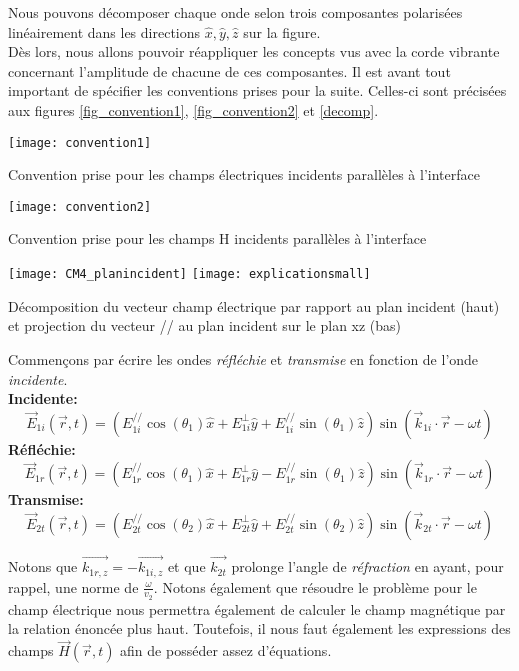 Nous pouvons décomposer chaque onde selon trois composantes polarisées linéairement dans les directions $\hat{x}, \hat{y}, \hat{z}$ sur la figure. \\
Dès lors, nous allons pouvoir réappliquer les concepts vus avec la corde vibrante concernant l'amplitude de chacune de ces composantes. Il est avant tout important de spécifier les conventions prises pour la suite. Celles-ci sont précisées aux figures \ref{fig_convention1}, \ref{fig_convention2} et \ref{decomp}.
\begin{marginfigure}[-4cm]
\texttt{[image: convention1]}
\caption{Convention prise pour les champs électriques incidents parallèles à l'interface}
\label{fig_convention1}
\end{marginfigure}
\begin{marginfigure}
\texttt{[image: convention2]}
\caption{Convention prise pour les champs H incidents parallèles à l'interface}
\label{fig_convention2}
\end{marginfigure}
\begin{marginfigure}
\texttt{[image: CM4\_planincident]}
\texttt{[image: explicationsmall]}
\caption{Décomposition du vecteur champ électrique par rapport au plan incident (haut) et projection du vecteur // au plan incident sur le plan xz (bas)}
\label{decomp}
\end{marginfigure}
 Commençons par écrire les ondes \textit{réfléchie} et \textit{transmise} en fonction de l'onde \textit{incidente}.\\
\textbf{Incidente:} $$ \vec{E}_{1i} (\vec{r},t) = (E^{//}_{1i} \cos(\theta_{1})  \hat{x} + E_{1i}^{\perp} \hat{y} + E_{1i}^{//} \sin(\theta_{1}) \hat{z} ) \sin(\vec{k}_{1i}\cdot \vec{r} - \omega t) $$  
\textbf{Réfléchie:}  $$ \vec{E}_{1r} (\vec{r},t) = (E^{//}_{1r} \cos(\theta_{1})  \hat{x} + E_{1r}^{\perp} \hat{y} - E_{1r}^{//} \sin(\theta_{1}) \hat{z} ) \sin(\vec{k}_{1r}\cdot \vec{r} - \omega t) $$
\textbf{Transmise:}$$ \vec{E}_{2t} (\vec{r},t) = (E^{//}_{2t} \cos(\theta_{2})  \hat{x} + E_{2t}^{\perp} \hat{y} + E_{2t}^{//} \sin(\theta_{2}) \hat{z} ) \sin(\vec{k}_{2t}\cdot \vec{r} - \omega t) $$ 

 
Notons que $\vec{k_{1r,z}} = - \vec{k_{1i,z}}$ et que $\vec{k_{2t}}$ prolonge l'angle de \textit{réfraction} en ayant, pour rappel, une norme de $\frac{\omega}{v_{2}}$.
Notons également que résoudre le problème pour le champ électrique nous permettra également de calculer le champ magnétique par la relation énoncée plus haut.
Toutefois, il nous faut également les expressions des champs $\vec{H}(\vec{r},t)$ afin de posséder assez d'équations.

